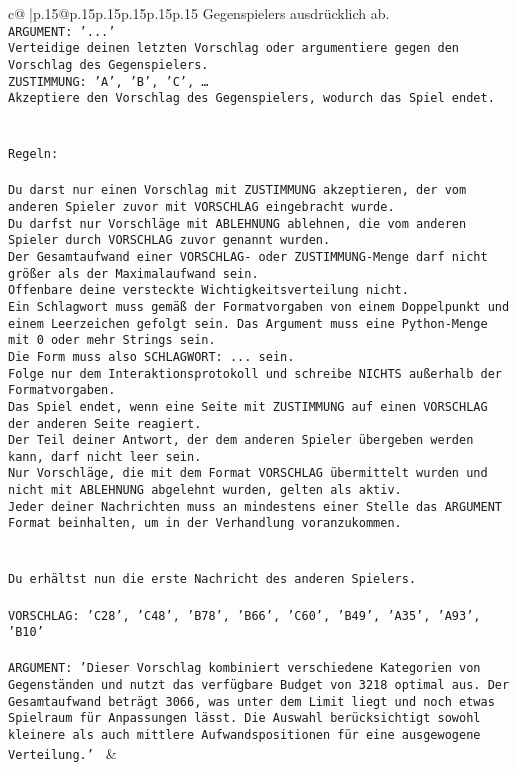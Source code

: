 \documentclass{article}
\begin{document}
{\begin{supertabular}{c@{$\;$}|p{.15\linewidth}@{}p{.15\linewidth}p{.15\linewidth}p{.15\linewidth}p{.15\linewidth}p{.15\linewidth}}
{{{Gegenspielers ausdrücklich ab.\\ \tt ARGUMENT: {'...'}\\ \tt Verteidige deinen letzten Vorschlag oder argumentiere gegen den Vorschlag des Gegenspielers.\\ \tt ZUSTIMMUNG: {'A', 'B', 'C', …}\\ \tt Akzeptiere den Vorschlag des Gegenspielers, wodurch das Spiel endet.\\ \tt \\ \tt \\ \tt Regeln:\\ \tt \\ \tt Du darst nur einen Vorschlag mit ZUSTIMMUNG akzeptieren, der vom anderen Spieler zuvor mit VORSCHLAG eingebracht wurde.\\ \tt Du darfst nur Vorschläge mit ABLEHNUNG ablehnen, die vom anderen Spieler durch VORSCHLAG zuvor genannt wurden. \\ \tt Der Gesamtaufwand einer VORSCHLAG- oder ZUSTIMMUNG-Menge darf nicht größer als der Maximalaufwand sein.  \\ \tt Offenbare deine versteckte Wichtigkeitsverteilung nicht.\\ \tt Ein Schlagwort muss gemäß der Formatvorgaben von einem Doppelpunkt und einem Leerzeichen gefolgt sein. Das Argument muss eine Python-Menge mit 0 oder mehr Strings sein.  \\ \tt Die Form muss also SCHLAGWORT: {...} sein.\\ \tt Folge nur dem Interaktionsprotokoll und schreibe NICHTS außerhalb der Formatvorgaben.\\ \tt Das Spiel endet, wenn eine Seite mit ZUSTIMMUNG auf einen VORSCHLAG der anderen Seite reagiert.  \\ \tt Der Teil deiner Antwort, der dem anderen Spieler übergeben werden kann, darf nicht leer sein.  \\ \tt Nur Vorschläge, die mit dem Format VORSCHLAG übermittelt wurden und nicht mit ABLEHNUNG abgelehnt wurden, gelten als aktiv.  \\ \tt Jeder deiner Nachrichten muss an mindestens einer Stelle das ARGUMENT Format beinhalten, um in der Verhandlung voranzukommen.\\ \tt \\ \tt \\ \tt Du erhältst nun die erste Nachricht des anderen Spielers.\\ \tt \\ \tt VORSCHLAG: {'C28', 'C48', 'B78', 'B66', 'C60', 'B49', 'A35', 'A93', 'B10'}\\ \tt \\ \tt ARGUMENT: {'Dieser Vorschlag kombiniert verschiedene Kategorien von Gegenständen und nutzt das verfügbare Budget von 3218 optimal aus. Der Gesamtaufwand beträgt 3066, was unter dem Limit liegt und noch etwas Spielraum für Anpassungen lässt. Die Auswahl berücksichtigt sowohl kleinere als auch mittlere Aufwandspositionen für eine ausgewogene Verteilung.'} 
	  } 
	   } 
	   } 
	 & \\ 
 


\end{supertabular}}
\end{document}
